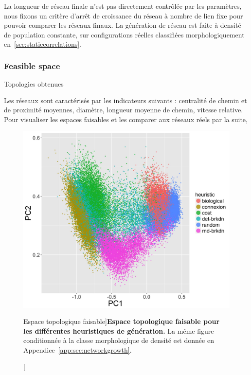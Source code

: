 La longueur de réseau finale n'est pas directement contrôlée par les paramètres, nous fixons un critère d'arrêt de croissance du réseau à nombre de lien fixe pour pouvoir comparer les réseaux finaux. La génération de réseau est faite à densité de population constante, sur configurations réelles classifiées morphologiquement en~\ref{sec:staticcorrelations}. 


\subsubsection{Feasible space}{Topologies obtenues}

Les réseaux sont caractérisés par les indicateurs suivants : centralité de chemin et de proximité moyennes, diamètre, longueur moyenne de chemin, vitesse relative. Pour visualiser les espaces faisables et les comparer aux réseaux réels par la suite, 





\begin{figure}
\includegraphics[width=\linewidth]{Figures/Final/7-1-2-fig-networkgrowth-feasiblespace.jpg}
\caption[Feasible topological space][Espace topologique faisable]{}{\textbf{Espace topologique faisable pour les différentes heuristiques de génération.} La même figure conditionnée à la classe morphologique de densité est donnée en Appendice~\ref{app:sec:networkgrowth}.\label{fig:networkgrowth:feasiblespace}}
\end{figure}

